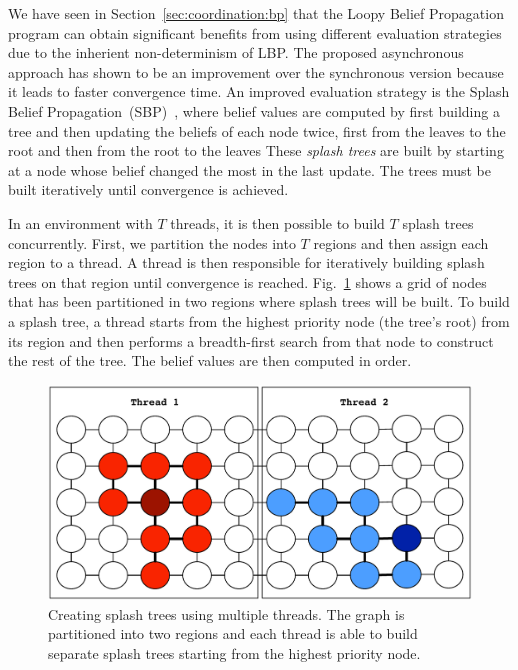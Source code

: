 We have seen in Section~\ref{sec:coordination:bp} that the Loopy Belief
Propagation program can obtain significant benefits from using different
evaluation strategies due to the inherient non-determinism of LBP.  The proposed
asynchronous approach has shown to be an improvement over the synchronous
version because it leads to faster convergence time. An improved evaluation
strategy is the Splash Belief
Propagation~(SBP)~\cite{Gonzalez+al:aistats09paraml}, where belief values are
computed by first building a tree and then updating the beliefs of each node
twice, first from the leaves to the root and then from the root to the leaves
These \emph{splash trees} are built by starting at a node whose belief changed
the most in the last update. The trees must be built iteratively until
convergence is achieved.

In an environment with $T$ threads, it is then possible to build $T$ splash
trees concurrently. First, we partition the nodes into $T$ regions and then
assign each region to a thread. A thread is then responsible for iteratively
building splash trees on that region until convergence is reached.
Fig.~\ref{fig:threads:splash_bp} shows a grid of nodes that has been partitioned
in two regions where splash trees will be built. To build a splash tree, a
thread starts from the highest priority node (the tree's root) from its region
and then performs a breadth-first search from that node to construct the rest of
the tree. The belief values are then computed in order.

\begin{figure}[ht]
   \begin{center}
      \includegraphics[width=0.7\linewidth]{figures/threads/splash_bp}
   \end{center}
   \caption{Creating splash trees using multiple threads. The graph is
      partitioned into two regions and each thread is able to build separate
   splash trees starting from the highest priority node.}
   \label{fig:threads:splash_bp}
\end{figure}

